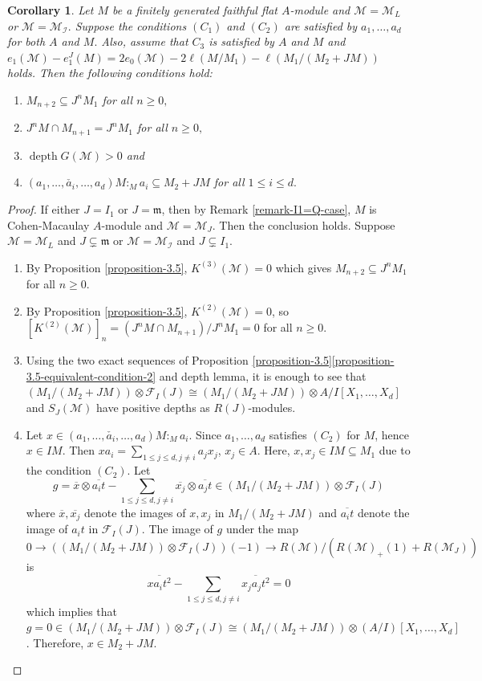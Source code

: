 \documentclass[10pt,a4paper]{amsart}
\newtheorem{corollary}{Corollary}
\def\I{{\mathcal I}}
\def\M{{\mathcal M}}
\DeclareMathOperator{\depth}{depth}
\newcommand{\m}{\mathfrak m}
\def\F{{\mathcal F}}
\begin{document}
\begin{corollary}\label{corollary-3.6} Let $M$ be a finitely generated faithful flat $A$-module and $\M=\M_L$ or $\M=\M_\I.$ Suppose the conditions $(C_1)$ and $(C_2)$  are satisfied by $a_1,\ldots,a_d$ for both $A$ and $M.$ Also, assume that $C_3$ is satisfied by $A$ and $M$ and  $e_1(\M)-e_1^J(M)=2e_0(\M)-2\ell(M/M_1)-\ell(M_1/(M_2+JM))$ holds. Then the following conditions hold:
	\begin{enumerate}[label=(\roman*)]
		\item $M_{n+2}\subseteq J^n M_1$ for all $n\geq 0, $
		\item $J^nM\cap M_{n+1}=J^n M_1$ for all $n\geq 0,$
		\item $\depth G(\mathcal{\M})>0$ and 
		\item $(a_1,\ldots,\check{a_i},\ldots,a_d)M:_Ma_i\subseteq M_2+JM$ for all $1\leq i\leq d.$
	\end{enumerate}
\end{corollary}
\begin{proof}
	If either $J=I_1$ or $J=\m$, then by Remark \ref{remark-I1=Q-case}, $M$ is Cohen-Macaulay $A$-module and $\M=\M_J$. Then the conclusion holds. 
	Suppose $\M=\M_L$ and $J\subsetneq \m $ or $\M=\M_\I$ and $J\subsetneq I_1.$ 
	\begin{enumerate}[label=(\roman*)]
		\item By Proposition \ref{proposition-3.5}, $K^{(3)}(\M)=0$ which gives $M_{n+2}\subseteq J^n M_1 $ for all $n\geq 0$. 
		\item By Proposition \ref{proposition-3.5}, $K^{(2)}(\M)=0$, so $[K^{(2)}(\M)]_n=(J^nM\cap M_{n+1})/J^n M_1=0$ for all $n\geq 0.$
		\item Using the two exact sequences of Proposition \ref{proposition-3.5}\ref{proposition-3.5-equivalent-condition-2}  and depth lemma, it is enough to see that $(M_1/(M_2+JM))\otimes \F_I(J)\cong (M_1/(M_2+JM))\otimes A/I[X_1,\ldots,X_d]$ and $S_J(\M)$ have positive depths as $R(J)$-modules. 
		\item Let $x\in (a_1,\ldots,\check{a_i},\ldots,a_d)M:_Ma_i$. Since $a_1,\ldots,a_d$ satisfies $(C_2)$ for $M$, hence $x\in IM$. Then $xa_i=\mathop\sum\limits_{1\leq j\leq d, j\neq i} a_jx_j$, $x_j\in A$. Here, $x,x_j\in IM\subseteq M_1$ due to the condition $(C_2)$. Let 
		$$g=\overline{x}\otimes \overline{a_it}-\mathop\sum\limits_{1\leq j\leq d, j\neq i} \overline{x_j}\otimes \overline{a_jt}\in (M_1/(M_2+JM))\otimes \F_I(J)$$
		where $\overline{x}, \overline{x_j}$ denote the images of $x,x_j$ in $M_1/(M_2+JM)$ and $\overline{a_it}$ denote the image of $a_it$ in $\F_I(J)$. The image of $g$ under the map $0\to ((M_1/(M_2+JM))\otimes \F_I(J))(-1)\to R(\M)/(R(\M)_+(1)+R(\M_J))$ is 
		$$\overline{xa_it^2}-\mathop\sum\limits_{1\leq j\leq d,j\neq i} \overline{x_ja_jt^2}=0$$
		which implies that $g=0\in (M_1/(M_2+JM))\otimes \F_I(J) \cong (M_1/(M_2+JM))\otimes (A/I)[X_1,\ldots,X_d]$. Therefore, $x\in M_2+JM.$\qedhere
	\end{enumerate}
\end{proof}
\end{document}

